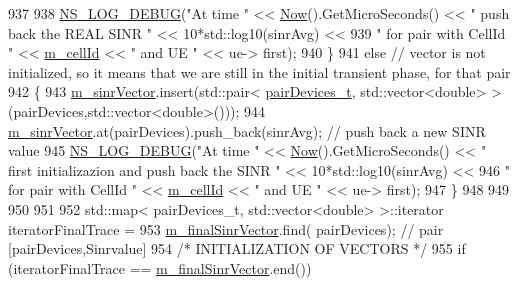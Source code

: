 \begin{DoxyCode}
937                                 
938                                 \hyperlink{group__logging_ga413f1886406d49f59a6a0a89b77b4d0a}{NS\_LOG\_DEBUG}(\textcolor{stringliteral}{"At time "} << \hyperlink{group__simulator_gac3635e2e87f7ce316c89290ee1b01d0d}{Now}().GetMicroSeconds() << \textcolor{stringliteral}{" push
       back the REAL SINR "} << 10*std::log10(sinrAvg) <<
939                                          \textcolor{stringliteral}{" for pair with CellId "} << \hyperlink{classns3_1_1MmWavePhy_a0594531da45f93220d4f5de292bae823}{m\_cellId} << \textcolor{stringliteral}{" and UE "} << ue->
      first);
940                         \}
941                         \textcolor{keywordflow}{else} \textcolor{comment}{// vector is not initialized, so it means that we are still in the initial
       transient phase, for that pair}
942                         \{
943                                 \hyperlink{classns3_1_1MmWaveEnbPhy_a9e1e37ef62d54fbfc28bfd829e78f239}{m\_sinrVector}.insert(std::pair<
      \hyperlink{namespacens3_abe460b1ad735ce7c8e408857371b87af}{pairDevices\_t}, std::vector<double> >(pairDevices,std::vector<double>()));
944                                 \hyperlink{classns3_1_1MmWaveEnbPhy_a9e1e37ef62d54fbfc28bfd829e78f239}{m\_sinrVector}.at(pairDevices).push\_back(sinrAvg); \textcolor{comment}{// push back a
       new SINR value}
945                                 \hyperlink{group__logging_ga413f1886406d49f59a6a0a89b77b4d0a}{NS\_LOG\_DEBUG}(\textcolor{stringliteral}{"At time "} << \hyperlink{group__simulator_gac3635e2e87f7ce316c89290ee1b01d0d}{Now}().GetMicroSeconds() << \textcolor{stringliteral}{"
       first initializazion and push back the SINR "} << 10*std::log10(sinrAvg) << 
946                                         \textcolor{stringliteral}{" for pair with CellId "} << \hyperlink{classns3_1_1MmWavePhy_a0594531da45f93220d4f5de292bae823}{m\_cellId} << \textcolor{stringliteral}{" and UE "} << ue->
      first);
947                         \}       
948 
949                 
950 
951 
952                         std::map< pairDevices\_t, std::vector<double> >::iterator iteratorFinalTrace =
953                                                          \hyperlink{classns3_1_1MmWaveEnbPhy_a6c34c832c1bcb05fab00a4435cc499d0}{m\_finalSinrVector}.find(
      pairDevices); \textcolor{comment}{// pair [pairDevices,Sinrvalue] }
954                         \textcolor{comment}{/* INITIALIZATION OF VECTORS */}
955                         \textcolor{keywordflow}{if} (iteratorFinalTrace == \hyperlink{classns3_1_1MmWaveEnbPhy_a6c34c832c1bcb05fab00a4435cc499d0}{m\_finalSinrVector}.end())

\end{DoxyCode}
